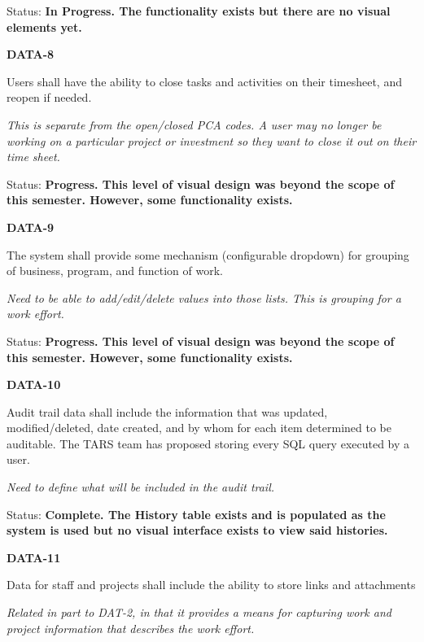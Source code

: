 \textit{ }Status: \textbf{In Progress.  The functionality exists but there are no visual elements yet.}\\

\noindent 

\noindent \textbf{DATA-8}

\noindent Users shall have the ability to close tasks and activities on their timesheet, and reopen if needed.

\noindent \textit{This is separate from the open/closed PCA codes.  A user may no longer be working on a particular project or investment so they want to close it out on their time sheet.}

\noindent Status: \textbf{Progress.  This level of visual design was beyond the scope of this semester.  However, some functionality exists.}\\

\noindent 

\noindent \textbf{DATA-9}

\noindent The system shall provide some mechanism (configurable dropdown) for grouping of business, program, and function of work.

\textit{Need to be able to add/edit/delete values into those lists. This is grouping for a work effort.}

\noindent Status: \textbf{Progress.  This level of visual design was beyond the scope of this semester.  However, some functionality exists.}\\

\noindent 

\noindent \textbf{DATA-10}

\noindent Audit trail data shall include the information that was updated, modified/deleted, date created, and by whom for each item determined to be auditable. The TARS team has proposed storing every SQL query executed by a user.

 \textit{Need to define what will be included in the audit trail.}

\noindent Status: \textbf{Complete.  The History table exists and is populated as the system is used but no visual interface exists to view said histories.}\textit{}\\

\noindent 

\noindent \textbf{DATA-11}

\noindent Data for staff and projects shall include the ability to store links and attachments

\noindent \textit{Related in part to DAT-2, in that it provides a means for capturing work and project information that describes the work effort.}

